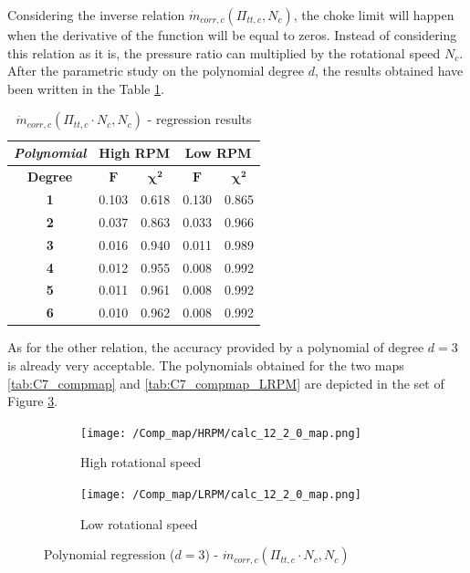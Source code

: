 Considering the inverse relation $\dot{m}_{corr,c}(\Pi_{tt,c},N_c)$, the choke limit will happen when the derivative of the function will be equal to zeros. Instead of considering this relation as it is, the pressure ratio can multiplied by the rotational speed $N_c$. After the parametric study on the polynomial degree $d$, the results obtained have been written in the Table \ref{tab:C7_regcomp4}.

\begin{longtable}[c]{@{}ccc|cc@{}}
\caption{$\dot{m}_{corr,c}(\Pi_{tt,c}\cdot N_c,N_c)$ - regression results}
\label{tab:C7_regcomp4}\\
\toprule
\textit{\textbf{Polynomial}} & \multicolumn{2}{c|}{High RPM}  & \multicolumn{2}{c}{Low RPM}    \\* \midrule
\endfirsthead
%
\endhead
%
\bottomrule
\endfoot
%
\endlastfoot
%
\textbf{Degree}              & \multicolumn{1}{c}{$\mathbf{F}$} & \multicolumn{1}{c|}{$\mathbf{\chi^2}$} & \multicolumn{1}{c}{$\mathbf{F}$} & \multicolumn{1}{c}{$\mathbf{\chi^2}$} \\
\textbf{1}                   & 0.103      & 0.618             & 0.130      & 0.865             \\
\textbf{2}                   & 0.037      & 0.863             & 0.033      & 0.966             \\
\textbf{3}                   & 0.016      & 0.940             & 0.011      & 0.989             \\
\textbf{4}                   & 0.012      & 0.955             & 0.008      & 0.992             \\
\textbf{5}                   & 0.011      & 0.961             & 0.008      & 0.992             \\
\textbf{6}                   & 0.010      & 0.962             & 0.008      & 0.992             \\* \bottomrule
\end{longtable}

As for the other relation, the accuracy provided by a polynomial of degree $d=3$ is already very acceptable. The polynomials obtained for the two maps \ref{tab:C7_compmap} and \ref{tab:C7_compmap_LRPM} are depicted in the set of Figure \ref{fig:C7_polycomp_m}.

\begin{figure}[H]
    \centering
    \begin{subfigure}[b]{0.4\textwidth}
        \centering
        \texttt{[image: /Comp\_map/HRPM/calc\_12\_2\_0\_map.png]}
        \caption{High rotational speed}
        \label{fig:C7_polycomp_m_HRPM}
    \end{subfigure}
    \begin{subfigure}[b]{0.4\textwidth}
        \centering
        \texttt{[image: /Comp\_map/LRPM/calc\_12\_2\_0\_map.png]}
        \caption{Low rotational speed}
        \label{fig:C7_polycomp_m_LRPM}
    \end{subfigure}
    \caption{Polynomial regression ($d=3$) - $\dot{m}_{corr,c}(\Pi_{tt,c}\cdot N_c,N_c)$} \label{fig:C7_polycomp_m}
\end{figure}

